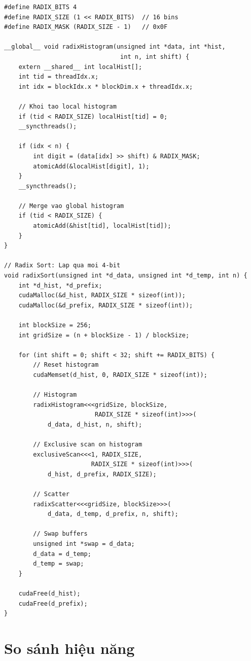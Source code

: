 \begin{lstlisting}[caption={Radix Sort 4-bit với CUDA}, label={lst:radix_sort_cuda}]
#define RADIX_BITS 4
#define RADIX_SIZE (1 << RADIX_BITS)  // 16 bins
#define RADIX_MASK (RADIX_SIZE - 1)   // 0x0F

__global__ void radixHistogram(unsigned int *data, int *hist, 
                                int n, int shift) {
    extern __shared__ int localHist[];
    int tid = threadIdx.x;
    int idx = blockIdx.x * blockDim.x + threadIdx.x;
    
    // Khoi tao local histogram
    if (tid < RADIX_SIZE) localHist[tid] = 0;
    __syncthreads();
    
    if (idx < n) {
        int digit = (data[idx] >> shift) & RADIX_MASK;
        atomicAdd(&localHist[digit], 1);
    }
    __syncthreads();
    
    // Merge vao global histogram
    if (tid < RADIX_SIZE) {
        atomicAdd(&hist[tid], localHist[tid]);
    }
}

// Radix Sort: Lap qua moi 4-bit
void radixSort(unsigned int *d_data, unsigned int *d_temp, int n) {
    int *d_hist, *d_prefix;
    cudaMalloc(&d_hist, RADIX_SIZE * sizeof(int));
    cudaMalloc(&d_prefix, RADIX_SIZE * sizeof(int));
    
    int blockSize = 256;
    int gridSize = (n + blockSize - 1) / blockSize;
    
    for (int shift = 0; shift < 32; shift += RADIX_BITS) {
        // Reset histogram
        cudaMemset(d_hist, 0, RADIX_SIZE * sizeof(int));
        
        // Histogram
        radixHistogram<<<gridSize, blockSize, 
                         RADIX_SIZE * sizeof(int)>>>(
            d_data, d_hist, n, shift);
        
        // Exclusive scan on histogram
        exclusiveScan<<<1, RADIX_SIZE, 
                        RADIX_SIZE * sizeof(int)>>>(
            d_hist, d_prefix, RADIX_SIZE);
        
        // Scatter
        radixScatter<<<gridSize, blockSize>>>(
            d_data, d_temp, d_prefix, n, shift);
        
        // Swap buffers
        unsigned int *swap = d_data;
        d_data = d_temp;
        d_temp = swap;
    }
    
    cudaFree(d_hist);
    cudaFree(d_prefix);
}
\end{lstlisting}

\section{So sánh hiệu năng}

